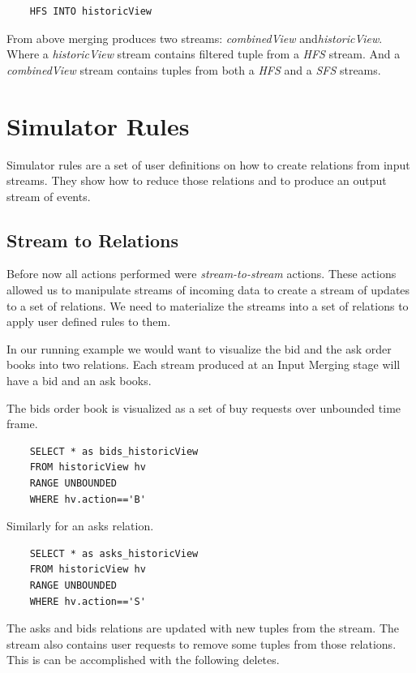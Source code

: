 \documentclass{article}
\begin{document}
\begin{verbatim} 
    HFS INTO historicView
\end{verbatim}

From above merging produces two streams: \emph{combinedView} and\emph{historicView}. Where a \emph{historicView} stream contains filtered tuple from a \emph{HFS} stream. And a \emph{combinedView} stream contains tuples from both a \emph{HFS} and a \emph{SFS} streams.


\section{Simulator Rules}

Simulator rules are a set of user definitions on how to create relations from input streams. They show how to reduce those relations and to produce an output stream of events. 

\subsection{Stream to Relations}
Before now all actions performed were \emph{stream-to-stream} actions. These actions allowed us to manipulate streams of incoming data to create a stream of updates to a set of relations. We need to materialize the streams into a set of relations to apply user defined rules to them. 

In our running example we would want to visualize the bid and the ask order books into two relations. Each stream produced at an Input Merging stage will have a bid and an ask books.

The bids order book is visualized as a set of buy requests over unbounded time frame.

\begin{verbatim}  
    SELECT * as bids_historicView
    FROM historicView hv
    RANGE UNBOUNDED
    WHERE hv.action=='B'
\end{verbatim}

\noindent Similarly for an asks relation.

\begin{verbatim}  
    SELECT * as asks_historicView
    FROM historicView hv
    RANGE UNBOUNDED
    WHERE hv.action=='S'
\end{verbatim}

\noindent The asks and bids relations are updated with new tuples from the stream. The stream also contains user requests to remove some tuples from those relations. This is can be accomplished with the following deletes.
\end{document}
